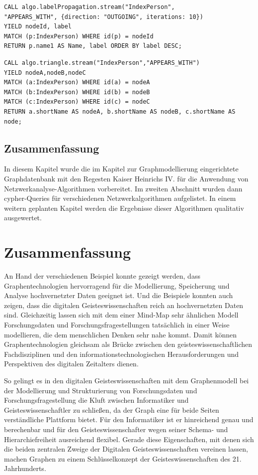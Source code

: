 \documentclass[ngerman,]{scrreprt}
\begin{document}
\begin{verbatim}
CALL algo.labelPropagation.stream("IndexPerson",
"APPEARS_WITH", {direction: "OUTGOING", iterations: 10})
YIELD nodeId, label
MATCH (p:IndexPerson) WHERE id(p) = nodeId
RETURN p.name1 AS Name, label ORDER BY label DESC;
\end{verbatim}

\begin{verbatim}
CALL algo.triangle.stream("IndexPerson","APPEARS_WITH")
YIELD nodeA,nodeB,nodeC
MATCH (a:IndexPerson) WHERE id(a) = nodeA
MATCH (b:IndexPerson) WHERE id(b) = nodeB
MATCH (c:IndexPerson) WHERE id(c) = nodeC
RETURN a.shortName AS nodeA, b.shortName AS nodeB, c.shortName AS node;
\end{verbatim}

\section{Zusammenfassung}\label{zusammenfassung-7}

In diesem Kapitel wurde die im Kapitel zur Graphmodellierung eingerichtete Graphdatenbank mit den Regesten Kaiser Heinrichs IV. für die Anwendung von Netzwerkanalyse-Algorithmen vorbereitet. Im zweiten Abschnitt wurden dann cypher-Queries für verschiedenen Netzwerkalgorithmen aufgelistet. In einem weitern geplanten Kapitel werden die Ergebnisse dieser Algorithmen qualitativ ausgewertet.

\chapter{Zusammenfassung}\label{zusammenfassung-8}

An Hand der verschiedenen Beispiel konnte gezeigt werden, dass Graphentechnologien hervorragend für die Modellierung, Speicherung und Analyse hochvernetzter Daten geeignet ist. Und die Beispiele konnten auch zeigen, dass die digitalen Geisteswissenschaften reich an hochvernetzten Daten sind. Gleichzeitig lassen sich mit dem einer Mind-Map sehr ähnlichen Modell Forschungsdaten und Forschungsfragestellungen tatsächlich in einer Weise modellieren, die dem menschlichen Denken sehr nahe kommt. Damit können Graphentechnologien gleichsam als Brücke zwischen den geisteswissenschaftlichen Fachdisziplinen und den informationstechnologischen Herausforderungen und Perspektiven des digitalen Zeitalters dienen.

So gelingt es in den digitalen Geisteswissenschaften mit dem Graphenmodell bei der Modellierung und Strukturierung von Forschungsdaten und Forschungsfragestellung die Kluft zwischen Informatiker und Geisteswissenschaftler zu schließen, da der Graph eine für beide Seiten verständliche Plattform bietet. Für den Informatiker ist er hinreichend genau und berechenbar und für den Geisteswissenschafter wegen seiner Schema- und Hierarchiefreiheit ausreichend flexibel. Gerade diese Eigenschaften, mit denen sich die beiden zentralen Zweige der Digitalen Geisteswissenschaften vereinen lassen, machen Graphen zu einem Schlüsselkonzept der Geisteswissenschaften des 21. Jahrhunderts.
\end{document}
